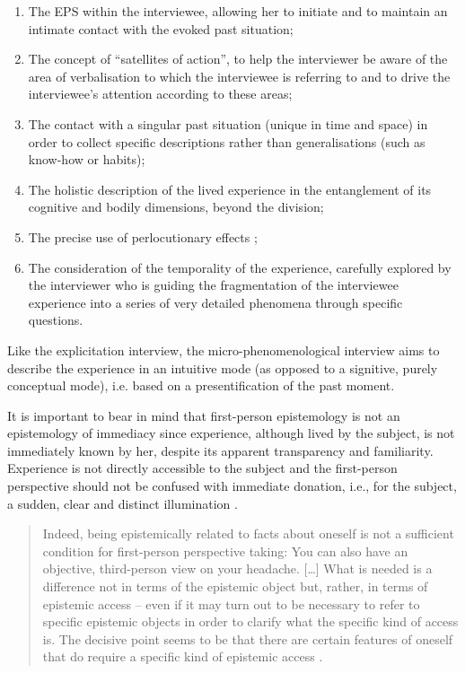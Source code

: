 \documentclass[output=paper]{langscibook}
\begin{document}
\begin{enumerate}

\item The EPS within the interviewee, allowing her to initiate and to maintain an intimate contact with the evoked past situation; 

\item The concept of “satellites of action”, to help the interviewer be aware of the area of verbalisation to which the interviewee is referring to and to drive the interviewee's attention according to these areas; 

\item The contact with a singular past situation (unique in time and space) in order to collect specific descriptions rather than generalisations (such as know-how or habits); 

\item The holistic description of the lived experience in the entanglement of its cognitive and bodily dimensions, beyond the division; 

\item The precise use of perlocutionary effects \citep{Austin1962};

\item The consideration of the temporality of the experience, carefully explored by the interviewer who is guiding the fragmentation of the interviewee experience into a series of very detailed phenomena through specific questions. 

\end{enumerate}

Like the explicitation interview, the micro-phenomenological interview aims to describe the experience in an intuitive mode (as opposed to a signitive, purely conceptual mode), i.e. based on a presentification of the past moment.

It is important to bear in mind that first-person epistemology is not an epistemology of immediacy since experience, although lived by the subject, is not immediately known by her, despite its apparent transparency and familiarity. Experience is not directly accessible to the subject and the first-person perspective should not be confused with immediate donation, i.e., for the subject, a sudden, clear and distinct illumination \citep{Vermersch2000}. 

\begin{quote}Indeed, being epistemically related to facts about oneself is not a sufficient condition for first-person perspective taking: You can also have an objective, third-person view on your headache. […] What is needed is a difference not in terms of the epistemic object but, rather, in terms of epistemic access – even if it may turn out to be necessary to refer to specific epistemic objects in order to clarify what the specific kind of access is. The decisive point seems to be that there are certain features of oneself that do require a specific kind of epistemic access \citep[37--38]{Pauen2012}.
\end{quote}
\end{document}

